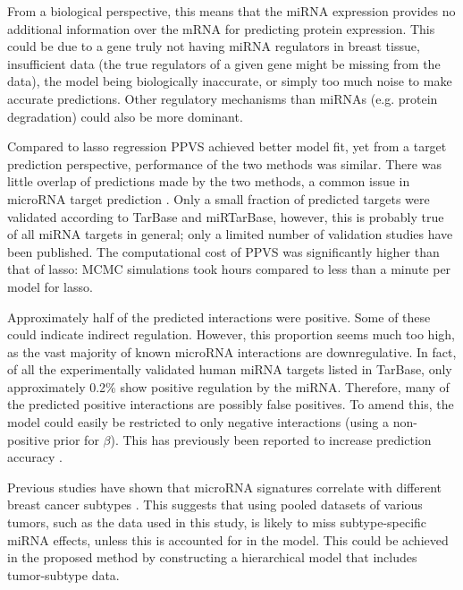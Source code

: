From a biological perspective, this means that the miRNA expression provides
no additional information over the mRNA for predicting protein expression.
This could be due to a gene truly not having miRNA regulators in breast
tissue, insufficient data (the true regulators of a given gene might be
missing from the data), the model being biologically inaccurate, or simply too
much noise to make accurate predictions. Other regulatory mechanisms than miRNAs
(e.g. protein degradation) could also be more dominant.


Compared to lasso regression PPVS achieved better model fit, yet from a target
prediction perspective, performance of the two methods was similar. There
was little overlap of predictions made by the two methods, a common issue in
microRNA target prediction \citep{vanIterson2013}. Only a small fraction of
predicted targets were validated according to TarBase and miRTarBase, however,
this is probably true of all miRNA targets in general; only a
limited number of validation studies have been published. The computational cost
of PPVS was significantly higher than that of lasso: MCMC simulations took hours
compared to less than a minute per model for lasso.

Approximately half of the predicted interactions were positive. Some of these
could indicate indirect regulation. However, this proportion seems much too
high, as the vast majority of known microRNA interactions are downregulative. In
fact, of all the experimentally validated human miRNA targets listed in
TarBase, only approximately 0.2\% show positive regulation by the miRNA.
Therefore, many of the predicted positive interactions are possibly false
positives. To amend this, the model could easily be restricted to only
negative interactions (using a non-positive prior for $\beta$). This has
previously been reported to increase prediction accuracy
\citep{Muniategui2013}.

Previous studies have shown that microRNA signatures correlate
with different breast cancer subtypes \citep{Blenkiron2007}. This suggests that
using pooled datasets of various tumors, such as the data used in this
study, is likely to miss subtype-specific miRNA effects, unless this is accounted
for in the model. This could be achieved in the proposed method by
constructing a hierarchical model that includes tumor-subtype data.

